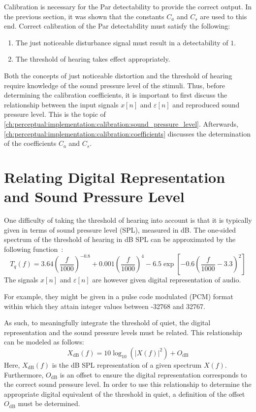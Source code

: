 Calibration is necessary for the Par detectability to provide the correct output.
In the previous section, it was shown that the constants $C_a$ and $C_s$ are used to this end.
Correct calibration of the Par detectability must satisfy the following:
\begin{enumerate}
    \item The just noticeable disturbance signal must result in a detectability of $1$.
    \item The threshold of hearing takes effect appropriately.
\end{enumerate}
Both the concepts of just noticeable distortion and the threshold of hearing require knowledge of the sound pressure level of the stimuli.
Thus, before determining the calibration coefficients, it is important to first discuss the 
relationship between the input signals $x[n]$ and $\varepsilon[n]$ and reproduced sound pressure level.
This is the topic of \autoref{ch:perceptual:implementation:calibration:sound_pressure_level}.
Afterwards, \autoref{ch:perceptual:implementation:calibration:coefficients} discusses the determination of 
the coefficients $C_a$ and $C_s$. 

\section{Relating Digital Representation and Sound Pressure Level}
\label{ch:perceptual:implementation:calibration:sound_pressure_level}
One difficulty of taking the threshold of hearing into account is that it is typically given in terms of sound pressure level (SPL), measured in dB. 
The one-sided spectrum of the threshold of hearing in dB SPL can be approximated by the following function~\cite{painter2000perceptual}:
\begin{equation}
    T_q(f) = 3.64\left(\frac{f}{1000}\right)^{-0.8} + 0.001\left(\frac{f}{1000}\right)^4 - 6.5\exp\left[-0.6\left(\frac{f}{1000}-3.3\right)^2\right]
\end{equation}
The signals $x[n]$ and $\varepsilon[n]$ are however given digital representation of audio. 

For example, they might be given in a pulse code modulated (PCM) format within which they attain integer values between -32768 and 32767.

As such, to meaningfully integrate the threshold of quiet, the digital representation and the sound pressure levels must be related.
This relationship can be modeled as follows:
\begin{equation}
    X_\text{dB}(f) = 10\log_{10}(\left|X(f)\right|^2) + O_\text{dB}
    \label{eq:perceptual:implementation:calibration:sound_pressure_level:dB_representation}
\end{equation}
Here, $X_\text{dB}(f)$ is the dB SPL representation of a given spectrum $X(f)$.
Furthermore, $O_\text{dB}$ is an offset to ensure the digital representation corresponds to the correct sound pressure level. 
In order to use this relationship to determine the appropriate digital equivalent of the threshold in quiet, a definition of the offset $O_\text{dB}$
must be determined.

